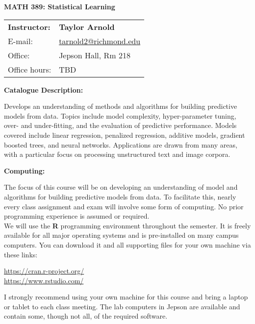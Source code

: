 \documentclass[12pt]{article}
\begin{document}
\begin{center}
{\bf MATH 389: Statistical Learning} \\
\end{center}

\bigskip

\noindent
\begin{tabular}{ l l }
{\bf Instructor:} &  {\bf Taylor Arnold} \\
E-mail: & \href{mailto:tarnold2@richmond.edu}{tarnold2@richmond.edu} \\
Office: & Jepson Hall, Rm 218 \\
Office hours: & TBD
\end{tabular}

\vspace{0.5cm}

\textbf{Catalogue Description:} \vspace{6pt}

Develops an understanding of methods and algorithms for building predictive
models from data. Topics include model complexity, hyper-parameter tuning,
over- and under-fitting, and the evaluation of predictive performance.
Models covered include linear regression, penalized regression,
additive models, gradient boosted trees, and neural networks.
Applications are drawn from many areas, with a particular focus
on processing unstructured text and image corpora.

\vspace{0.4cm}

\textbf{Computing:} \vspace{6pt}

The focus of this course will be on developing an understanding of model
and algorithms for building predictive models from data. To facilitate
this, nearly every class assignment and exam will involve some form of
computing. No prior programming experience is assumed or required. \\

We will use the \textbf{R} programming environment throughout the
semester. It is freely available for all major operating systems and
is pre-installed on many campus computers. You can download it and
all supporting files for your own machine via these links:
\begin{center}
\url{https://cran.r-project.org/} \\
\url{https://www.rstudio.com/}
\end{center}
I strongly recommend using your own machine for this course and
bring a laptop or tablet to each class meeting.
The lab computers in Jepson are available and contain some, though
not all, of the required software.
\end{document}
